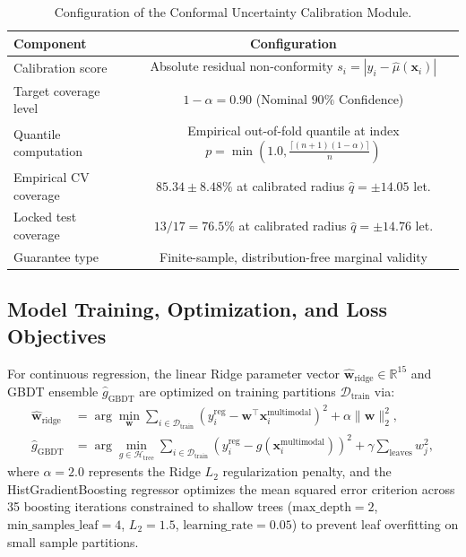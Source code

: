 \documentclass[preprint,12pt]{elsarticle}
\begin{document}
\begin{table}[t]
\centering
\caption{Configuration of the Conformal Uncertainty Calibration Module.}
\label{tab:conformal_engine}
\renewcommand{\arraystretch}{1.1}
\footnotesize
\begin{tabular}{lc}
\toprule
\textbf{Component} & \textbf{Configuration} \\
\midrule
Calibration score & Absolute residual non-conformity $s_i = |y_i - \hat{\mu}(\mathbf{x}_i)|$ \\
Target coverage level & $1 - \alpha = 0.90$ (Nominal $90\%$ Confidence) \\
Quantile computation & Empirical out-of-fold quantile at index $p = \min(1.0, \frac{\lceil (n+1)(1-\alpha) \rceil}{n})$ \\
Empirical CV coverage & $85.34 \pm 8.48\%$ at calibrated radius $\hat{q} = \pm 14.05$ let. \\
Locked test coverage & $13/17 = 76.5\%$ at calibrated radius $\hat{q} = \pm 14.76$ let. \\
Guarantee type & Finite-sample, distribution-free marginal validity \\
\bottomrule
\end{tabular}
\end{table}

\subsection{Model Training, Optimization, and Loss Objectives}
\label{sec:training_optimization}
For continuous regression, the linear Ridge parameter vector $\hat{\mathbf{w}}_{\text{ridge}} \in \mathbb{R}^{15}$ and GBDT ensemble $\hat{g}_{\text{GBDT}}$ are optimized on training partitions $\mathcal{D}_{\text{train}}$ via:
\begin{align}
\hat{\mathbf{w}}_{\text{ridge}} &= \arg\min_{\mathbf{w}} \sum_{i \in \mathcal{D}_{\text{train}}} \left( y_i^{\text{reg}} - \mathbf{w}^{\top}\mathbf{x}_i^{\text{multimodal}} \right)^2 + \alpha \|\mathbf{w}\|_2^2, \\
\hat{g}_{\text{GBDT}} &= \arg\min_{g \in \mathcal{H}_{\text{tree}}} \sum_{i \in \mathcal{D}_{\text{train}}} \left( y_i^{\text{reg}} - g(\mathbf{x}_i^{\text{multimodal}}) \right)^2 + \gamma \sum_{\text{leaves}} w_j^2,
\end{align}
where $\alpha = 2.0$ represents the Ridge $L_2$ regularization penalty, and the HistGradientBoosting regressor optimizes the mean squared error criterion across 35 boosting iterations constrained to shallow trees ($\text{max\_depth} = 2$, $\text{min\_samples\_leaf} = 4$, $L_2 = 1.5$, $\text{learning\_rate} = 0.05$) to prevent leaf overfitting on small sample partitions.
\end{document}
